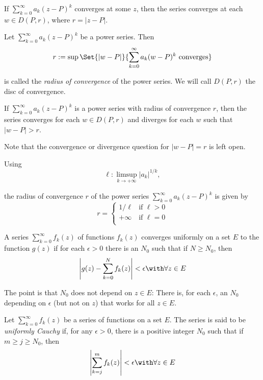 \label{d5d5bdc}

If $\sum_{k=0}^\infty a_k(z-P)^k$ converges at some $z$, then the series
converges at each $w\in D(P,r)$, where $r=|z-P|$.

\label{da6e337}

Let $\sum_{k=0}^\infty a_k(z-P)^k$ be a power series. Then
$$
  r:=\sup\Set{|w-P|}{\sum_{k=0}^\infty a_k(w-P)^k\text{ converges}}
$$

is called the \textit{radius of convergence} of the power series. We will call
$D(P,r)$ the disc of convergence.

\label{c7d0e1d}

If $\sum_{k=0}^\infty a_k(z-P)^k$ is a power series with radius of convergence
$r$, then the series converges for each $w\in D(P,r)$ and diverges for each $w$
such that $|w-P|>r$.

Note that the convergence or divergence question for $|w-P|=r$ is left open.

\label{a9ba20f}

Using
$$
  \ell:\limsup_{k\to+\infty}|a_k|^{1/k},
$$

the radius of convergence $r$ of the power series $\sum_{k=0}^\infty
a_k(z-P)^k$ is given by
\begin{equation*}
  r=\begin{cases}
    1/\ell  & \text{if } \ell>0 \\
    +\infty & \text{if } \ell=0 \\
  \end{cases}
\end{equation*}

\label{bba67e4}

A series $\sum_{k=0}^\infty f_k(z)$ of functions $f_k(z)$ converges uniformly
on a set $E$ to the function $g(z)$ if for each $\epsilon>0$ there is an $N_0$
such that if $N\geq N_0$, then
$$
  \left|g(z)-\sum_{k=0}^N f_k(z)\right|<\epsilon\with\forall z\in E
$$

The point is that $N_0$ does not depend on $z\in E$: There is, for each
$\epsilon$, an $N_0$ depending on $\epsilon$ (but not on $z$) that works for
all $z\in E$.

\label{bfe260e}

Let $\sum_{k=0}^\infty f_k(z)$ be a series of functions on a set $E$. The
series is said to be \textit{uniformly Cauchy} if, for any $\epsilon>0$, there
is a positive integer $N_0$ such that if $m\geq j\geq N_0$, then
$$
  \left|\sum_{k=j}^mf_k(z)\right|<\epsilon\with\forall z\in E
$$

